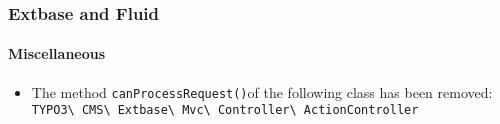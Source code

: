 %

\begin{frame}[fragile]
	\frametitle{Extbase and Fluid}
	\framesubtitle{Miscellaneous}


	\begin{itemize}
		\item The method \small\texttt{canProcessRequest()}\normalsize of the following class has been removed:
			\smaller\texttt{TYPO3\textbackslash
				CMS\textbackslash
				Extbase\textbackslash
				Mvc\textbackslash
				Controller\textbackslash
				ActionController}\normalsize
	\end{itemize}

\end{frame}

